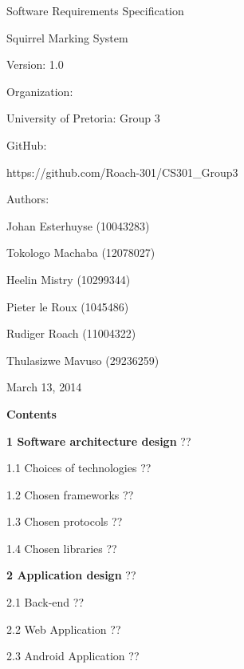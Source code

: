 \documentclass{article}
\begin{document}
\noindent 

\noindent 

\noindent 

\noindent 



 

\noindent 

\noindent  Software Requirements Specification

\noindent   Squirrel Marking System

\noindent   Version: 1.0

\noindent 

\noindent Organization:

\noindent University of Pretoria: Group 3

\noindent  GitHub:

\noindent  

 https://github.com/Roach-301/CS301\_Group3 

\noindent 

\noindent Authors:

\noindent Johan Esterhuyse (10043283)

\noindent Tokologo Machaba (12078027)

\noindent Heelin Mistry (10299344)

\noindent Pieter le Roux (1045486)

\noindent Rudiger Roach (11004322)

\noindent Thulasizwe Mavuso (29236259)

\noindent 

\noindent March 13, 2014 

  

\textbf{Contents}





\textbf{1  Software architecture design }??

    1.1  Choices of technologies ??

    1.2  Chosen frameworks ??

    1.3  Chosen protocols ??

    1.4  Chosen libraries ??



\textbf{2  Application design }??

    2.1  Back-end ??

    2.2  Web Application ??

    2.3  Android Application ??



 
\end{document}
